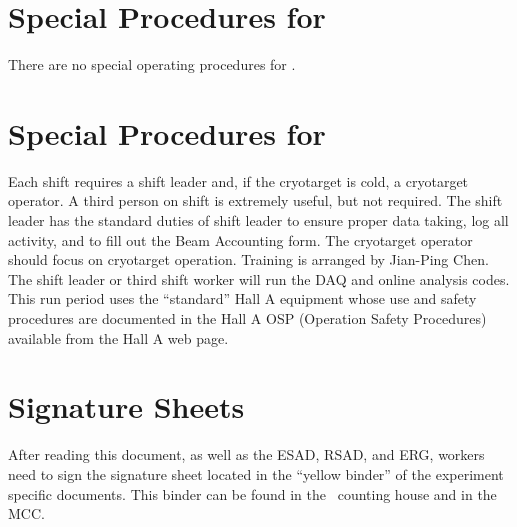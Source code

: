 %
\newpage
\section{Special Procedures for \HALL}

There are no special operating procedures for \HALL{}.

%
\newpage
\section{Special Procedures for \EXPTS}

Each shift requires a shift leader and, if the cryotarget is cold, a cryotarget 
operator.  A third person on shift is extremely useful, but not required. The shift leader 
has the standard
duties of shift leader to ensure proper data taking, log all activity, and to fill out
the Beam Accounting form. The cryotarget operator should focus on cryotarget
operation. Training is arranged by Jian-Ping Chen. The shift leader or third
shift worker will run the DAQ and online analysis codes.
This run period uses the ``standard'' Hall A equipment whose
use and safety procedures are documented in the Hall A OSP (Operation Safety
Procedures) available from the Hall A web page.


\newpage
\section{Signature Sheets}

After reading this document, as well as the ESAD, RSAD, and ERG, workers need to sign
the signature sheet located in the ``yellow binder'' of the experiment specific documents.
This binder can be found in the \HALL\ counting house and in the MCC.

